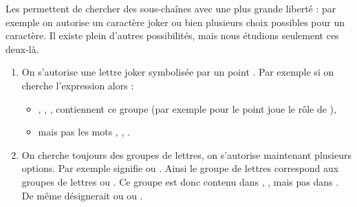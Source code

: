 \documentclass[11pt,class=report,crop=false]{standalone}
\begin{document}
\begin{cours}


Les  permettent de chercher des sous-chaînes avec une plus grande liberté : par exemple on autorise un caractère joker ou bien plusieurs choix possibles pour un caractère.
Il existe plein d'autres possibilités, mais nous étudions seulement ces deux-là.

\begin{enumerate}
  \item On s'autorise une lettre joker symbolisée par un point \og {} \fg{}. Par exemple si on cherche l'expression \og {} \fg{} alors :

\begin{itemize}
  \item {}, , ,  contiennent ce groupe (par exemple pour  le point joue le rôle de ),
  \item  mais pas les mots , , . 
\end{itemize}

  \item On cherche toujours des groupes de lettres, on s'autorise maintenant plusieurs options. Par exemple \og \mot{[CT]} \fg{} signifie \og {} ou  \fg{}. Ainsi le groupe de lettres \og {} \fg{} correspond aux groupes de lettres \og {} \fg{} ou \og {} \fg{}. Ce groupe est donc contenu dans , ,  mais pas dans . De même \og \mot{[ABC]} \fg{} désignerait \og {} ou   ou   \fg{}.

\end{enumerate}

 


\end{cours}
\end{document}
